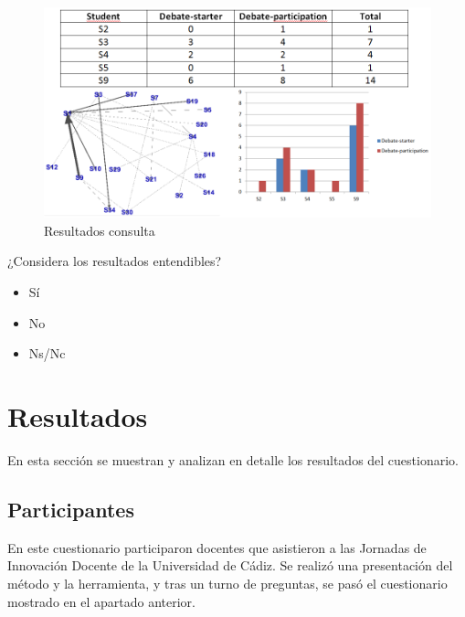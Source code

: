 \begin{figure}[H]
  \begin{center}
    \includegraphics[scale=0.4]{ResultadosConsulta.png}
  \end{center}
  \caption{Resultados consulta}
  \label{fig:ape:resultados:consulta}
\end{figure}

\begin{mdframed}[style=cuestionarioST]
	¿Considera los resultados entendibles?
			\begin{itemize}
				\item Sí
				\item No
				\item Ns/Nc
			\end{itemize}
\end{mdframed}



\newpage

\section{Resultados} \label{apc:eval:metodo:resultados}

En esta sección se muestran y analizan en detalle los resultados del cuestionario. %

\subsection{Participantes}

En este cuestionario participaron docentes que asistieron a las Jornadas de Innovación Docente de la Universidad de Cádiz. Se realizó una presentación del método y la herramienta, y tras un turno de preguntas, se pasó el cuestionario mostrado en el apartado anterior.

